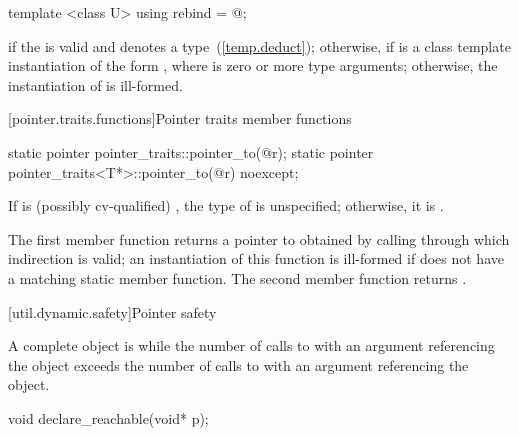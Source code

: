 %
%
\begin{itemdecl}
template <class U> using rebind = @\seebelow@;
\end{itemdecl}

\begin{itemdescr}
\pnum
\templalias {} if
the   is valid and denotes a
type~(\ref{temp.deduct}); otherwise,
 if
 is a class template instantiation of the form ,
where  is zero or more type arguments; otherwise, the instantiation of
 is ill-formed.
\end{itemdescr}

[pointer.traits.functions]{Pointer traits member functions}

%
%
\begin{itemdecl}
static pointer pointer_traits::pointer_to(@\seebelow@ r);
static pointer pointer_traits<T*>::pointer_to(@\seebelow@ r) noexcept;
\end{itemdecl}

\begin{itemdescr}
\pnum
\remark If  is (possibly cv-qualified) , the type of
 is unspecified; otherwise, it is .

\pnum
\returns The first member function returns a pointer to 
obtained by calling  through which
indirection is valid; an instantiation of this function is
ill-formed if  does not have a matching  static member
function. The second member function returns .
\end{itemdescr}

[util.dynamic.safety]{Pointer safety}

\pnum
A complete object is  while the number of calls to
 with an argument referencing the object exceeds the
number of calls to  with an argument referencing the
object.

%
\begin{itemdecl}
void declare_reachable(void* p);
\end{itemdecl}

